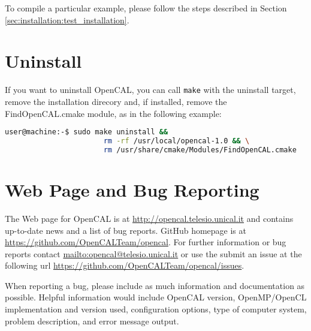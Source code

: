 To compile a particular example, please follow the steps described in
Section \ref{sec:installation:test_installation}.

\section{Uninstall}

If you want to uninstall OpenCAL, you can call \verb'make' with the
uninstall target, remove the installation direcory and, if installed,
remove the FindOpenCAL.cmake module, as in the following example:

\begin{lstlisting}[numbers=none,language=bash,label={ch:quickstart:sudouninstall}]
  user@machine:-$ sudo make uninstall && 
                       rm -rf /usr/local/opencal-1.0 && \
                       rm /usr/share/cmake/Modules/FindOpenCAL.cmake
\end{lstlisting}

\section{Web Page and Bug Reporting}

The Web page for OpenCAL is at \url{http://opencal.telesio.unical.it} and
contains up-to-date news and a list of bug reports. \ocal GitHub
homepage is at \url{https://github.com/OpenCALTeam/opencal}. For
further information or bug reports contact
\url{mailto:opencal@telesio.unical.it} or use the submit an issue at the
following url \url{https://github.com/OpenCALTeam/opencal/issues}.

When reporting a bug, please include as much information and
documentation as possible. Helpful information would include OpenCAL
version, OpenMP/OpenCL implementation and version used,
configuration options, type of computer system, problem description,
and error message output.
